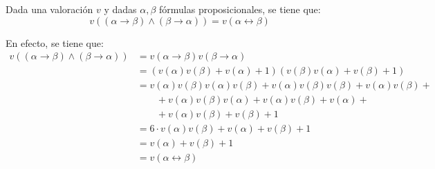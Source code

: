 \begin{ejemplo}
    Dada una valoración $v$ y dadas $\alpha,\beta$ fórmulas proposicionales, se tiene que:
    \begin{equation*}
        v\left((\alpha\rightarrow\beta) \land (\beta\rightarrow\alpha)\right) = 
        v(\alpha\leftrightarrow\beta)
    \end{equation*}

    En efecto, se tiene que:
    \begin{align*}
        v\left((\alpha\rightarrow\beta) \land (\beta\rightarrow\alpha)\right)
        &= v(\alpha\rightarrow\beta)v(\beta\rightarrow\alpha)\\
        &= \left(v(\alpha)v(\beta)+v(\alpha)+1\right)\left(v(\beta)v(\alpha)+v(\beta)+1\right)\\
        &= v(\alpha)v(\beta)v(\alpha)v(\beta) + v(\alpha)v(\beta)v(\beta) + v(\alpha)v(\beta) +\\
        &\qquad + v(\alpha)v(\beta)v(\alpha) + v(\alpha)v(\beta) + v(\alpha) +\\
        &\qquad + v(\alpha)v(\beta)+ v(\beta) + 1\\
        &= 6\cdot v(\alpha)v(\beta) + v(\alpha) + v(\beta) + 1\\
        &= v(\alpha) + v(\beta) + 1\\
        &= v(\alpha\leftrightarrow\beta)
    \end{align*}
\end{ejemplo}


